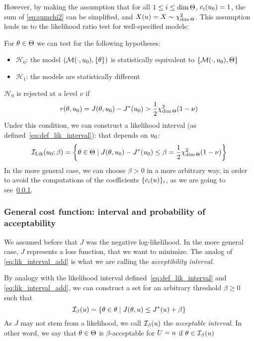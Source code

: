 \documentclass[../../Main_ManuscritThese.tex]{subfiles}
\begin{document}
  
 However, by making the assumption that for all $1 \leq i \leq \dim \Theta$, $c_i(u_0)=1$, the sum of \cref{eq:sumchi2} can be simplified, and $X(u) = X \sim \chi^2_{\dim \Theta}$. This assumption leads us to the likelihood ratio test for well-specified models:

 For $\theta\in \Theta$ we can test for the following hypotheses:
 \begin{itemize}
 \item $\mathcal{H}_0$: the model $\left(\mathcal{M}(\cdot, u_0), \{\theta\}\right)$ is statistically equivalent to $\left\{\mathcal{M}(\cdot, u_0), \Theta\right\}$
 \item $\mathcal{H}_1$: the models are statistically different
 \end{itemize}
 $\mathcal{H}_0$ is rejected at a level $\nu$ if
  \begin{align}
  r(\theta, u_0)=J(\theta, u_0) - J^*(u_0) > \frac{1}{2}\chi^2_{\dim \Theta}(1-\nu)
  \end{align}
  Under this condition, we can construct a likelihood interval (as defined~\cref{eq:def_lik_interval}): that depends on $u_0$:
  \begin{equation}
    \label{eq:lik_interval_add}
    \mathcal{I}_{\mathrm{Lik}}(u_0; \beta) = \left\{\theta\in \Theta \mid  J(\theta, u_0) - J^*(u_0) \leq \beta=\frac{1}{2}\chi^2_{\dim \Theta}(1-\nu)\right\}
  \end{equation}
   In the more general case, we can choose $\beta>0$ in a more arbitrary way, in order to avoid the computations of the coefficients $\{c_i(u)\}_i$, as we are going to see~\cref{ssec:general_cost_prob}.
     \subsubsection{General cost function: interval and probability of acceptability}
     \label{ssec:general_cost_prob}
 We assumed before that $J$ was the negative log-likelihood. In the more general case, $J$ represents a loss function, that we want to minimize. The analog of \cref{eq:lik_interval_add} is what we are calling the \emph{acceptibility interval}.
  \begin{definition}
  By analogy with the likelihood interval defined~\cref{eq:def_lik_interval} and \cref{eq:lik_interval_add}, we can construct a set for an arbitrary threshold $\beta \geq 0$ such that
  \begin{equation}
    \mathcal{I}_{\beta}(u) = \left\{\theta \in \theta \mid J(\theta,u) \leq J^*(u) + \beta \right\}
  \end{equation}
As $J$ may not stem from a likelihood, we call $\mathcal{I}_{\beta}(u)$ the \emph{acceptable interval}. In other word, we say that $\theta\in \Theta$ is $\beta$-acceptable for $U=u$ if $\theta \in \mathcal{I}_{\beta}(u)$
\end{definition}
\end{document}
